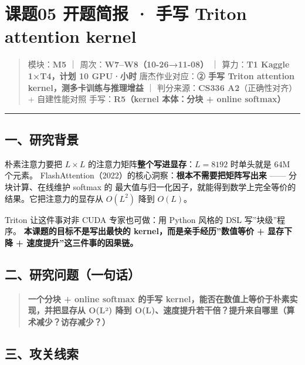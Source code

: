 \documentclass[
  chinese,
  11pt,
]{ctexart}
\begin{document}
\newpage

\section{课题05 开题简报 · 手写 Triton attention kernel}\label{ux8bfeux989805-ux5f00ux9898ux7b80ux62a5-ux624bux5199-triton-attention-kernel}

\begin{quote}
模块：\textbf{M5} ｜ 周次：\textbf{W7--W8（10-26→11-08）} ｜ 算力：\textbf{T1 Kaggle 1×T4，计划 10 GPU·小时} 唐杰作业对应：\textbf{② 手写 Triton attention kernel，测多卡训练与推理增益} ｜ 判分来源：\textbf{CS336 A2}（正确性对齐）+ 自建性能对照 手写：\textbf{R5（kernel 本体：分块 + online softmax）}
\end{quote}

\begin{center}\rule{0.5\linewidth}{0.5pt}\end{center}

\subsection{一、研究背景}\label{ux4e00ux7814ux7a76ux80ccux666f-3}

朴素注意力要把 \(L\times L\) 的注意力矩阵\textbf{整个写进显存}：\(L=8192\) 时单头就是 64M 个元素。 FlashAttention（2022）的核心洞察：\textbf{根本不需要把矩阵写出来} ------ 分块计算、在线维护 softmax 的 最大值与归一化因子，就能得到数学上完全等价的结果。它把注意力的显存从 \(O(L^2)\) 降到 \(O(L)\)。

Triton 让这件事对非 CUDA 专家也可做：用 Python 风格的 DSL 写''块级''程序。 \textbf{本课题的目标不是写出最快的 kernel，而是亲手经历''数值等价 + 显存下降 + 速度提升''这三件事的因果链。}

\subsection{二、研究问题（一句话）}\label{ux4e8cux7814ux7a76ux95eeux9898ux4e00ux53e5ux8bdd-3}

\begin{quote}
\textbf{一个分块 + online softmax 的手写 kernel，能否在数值上等价于朴素实现，并把显存从 O(L²) 降到 O(L)、速度提升若干倍？提升来自哪里（算术减少？访存减少？）}
\end{quote}

\subsection{三、攻关线索}\label{ux4e09ux653bux5173ux7ebfux7d22-3}
\end{document}
